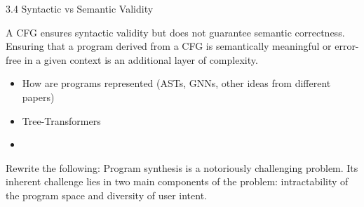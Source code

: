3.4 Syntactic vs Semantic Validity

A CFG ensures syntactic validity but does not guarantee semantic correctness. Ensuring that a program derived from a CFG is semantically meaningful or error-free in a given context is an additional layer of complexity.

\begin{itemize}
    \item How are programs represented (ASTs, GNNs, other ideas from different papers)
    \item Tree-Transformers
    \item 
\end{itemize}


Rewrite the following:
Program synthesis is a notoriously challenging problem. Its inherent challenge lies in two main components of the problem: intractability of the program space and diversity of user intent.

